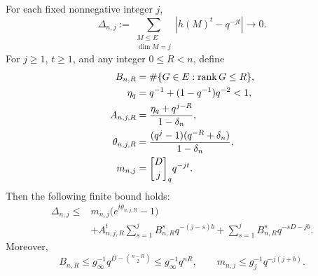 \begin{lemma}
\label{ker:aggregate}
For each fixed nonnegative integer $j$,
\begin{equation}
 \Delta_{n,j}:=
 \sum_{\substack{M\le E\\\dim M=j}}
 \left|h(M)^t-q^{-jt}\right|
 \longrightarrow0.
 \label{ker:aggregate-limit}
\end{equation}
For $j\ge1$, $t\ge1$, and any integer $0\le R<n$, define
\begin{align*}
 B_{n,R}&=\#\{G\in E:\operatorname{rank}G\le R\},\\
 \eta_q&=q^{-1}+(1-q^{-1})q^{-2}<1,\\
 A_{n,j,R}&=\frac{\eta_q+q^{j-R}}{1-\delta_n},\\
 \theta_{n,j,R}&=
 \frac{(q^j-1)(q^{-R}+\delta_n)}{1-\delta_n},\\
 m_{n,j}&=\qbinom Dj q^{-jt}.
\end{align*}
Then the following finite bound holds:
\begin{equation}
 \begin{split}
 \Delta_{n,j}\le{}&
 m_{n,j}\bigl(e^{t\theta_{n,j,R}}-1\bigr)\\
 &+A_{n,j,R}^{t}
       \sum_{s=1}^j B_{n,R}^{s}q^{-(j-s)b}
   +\sum_{s=1}^jB_{n,R}^{s}q^{-sD-jb}.
 \end{split}
 \label{ker:finite-aggregate}
\end{equation}
Moreover,
\begin{equation}
 B_{n,R}\le
 g_\infty^{-1}q^{D-\binom{n-R}{2}}
 \le g_\infty^{-1}q^{nR},
 \qquad
 m_{n,j}\le g_j^{-1}q^{-j(j+b)}.
 \label{ker:counts}
\end{equation}
\end{lemma}

